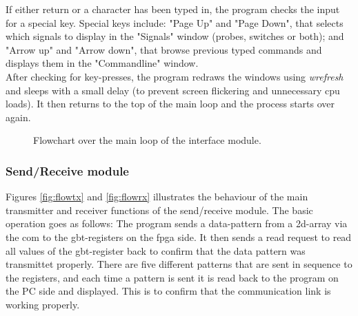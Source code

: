 \documentclass[main.tex]{subfiles}
\begin{document}
If either return or a character has been typed in, the program checks the input for a special key. Special keys include: "Page Up" and "Page Down", that selects which signals to display in the "Signals" window (probes, switches or both); and "Arrow up" and "Arrow down", that browse previous typed commands and displays them in the "Commandline" window.\\

After checking for key-presses, the program redraws the windows using \textit{wrefresh} and sleeps with a small delay (to prevent screen flickering and unnecessary cpu loads). It then returns to the top of the main loop and the process starts over again. 

\begin{figure}[!t] %
\begin{center}
\resizebox{1\linewidth}{!}{}
\caption{Flowchart over the main loop of the interface module.}
\label{fig:flowgui}
\end{center}
\end{figure}

\subsubsection{Send/Receive module}

Figures \ref{fig:flowtx} and \ref{fig:flowrx} illustrates the behaviour of the main transmitter and receiver functions of the send/receive module. The basic operation goes as follows: The program sends a data-pattern from a 2d-array via the \gls{com} to the \gls{gbt}-registers on the \gls{fpga} side. It then sends a read request to read all values of the \gls{gbt}-register back to confirm that the data pattern was transmittet properly. There are five different patterns that are sent in sequence to the registers, and each time a pattern is sent it is read back to the program on the PC side and displayed. This is to confirm that the communication link is working properly. \\
\end{document}
